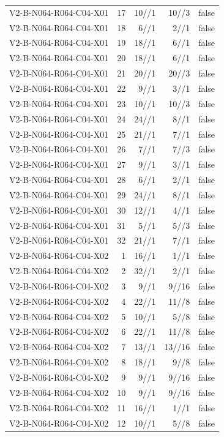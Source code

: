 {\begin{longtable}{lrrrr}
V2-B-N064-R064-C04-X01 & 17 & 10//1 & 10//3 & false \\
V2-B-N064-R064-C04-X01 & 18 & 6//1 & 2//1 & false \\
V2-B-N064-R064-C04-X01 & 19 & 18//1 & 6//1 & false \\
V2-B-N064-R064-C04-X01 & 20 & 18//1 & 6//1 & false \\
V2-B-N064-R064-C04-X01 & 21 & 20//1 & 20//3 & false \\
V2-B-N064-R064-C04-X01 & 22 & 9//1 & 3//1 & false \\
V2-B-N064-R064-C04-X01 & 23 & 10//1 & 10//3 & false \\
V2-B-N064-R064-C04-X01 & 24 & 24//1 & 8//1 & false \\
V2-B-N064-R064-C04-X01 & 25 & 21//1 & 7//1 & false \\
V2-B-N064-R064-C04-X01 & 26 & 7//1 & 7//3 & false \\
V2-B-N064-R064-C04-X01 & 27 & 9//1 & 3//1 & false \\
V2-B-N064-R064-C04-X01 & 28 & 6//1 & 2//1 & false \\
V2-B-N064-R064-C04-X01 & 29 & 24//1 & 8//1 & false \\
V2-B-N064-R064-C04-X01 & 30 & 12//1 & 4//1 & false \\
V2-B-N064-R064-C04-X01 & 31 & 5//1 & 5//3 & false \\
V2-B-N064-R064-C04-X01 & 32 & 21//1 & 7//1 & false \\
V2-B-N064-R064-C04-X02 & 1 & 16//1 & 1//1 & false \\
V2-B-N064-R064-C04-X02 & 2 & 32//1 & 2//1 & false \\
V2-B-N064-R064-C04-X02 & 3 & 9//1 & 9//16 & false \\
V2-B-N064-R064-C04-X02 & 4 & 22//1 & 11//8 & false \\
V2-B-N064-R064-C04-X02 & 5 & 10//1 & 5//8 & false \\
V2-B-N064-R064-C04-X02 & 6 & 22//1 & 11//8 & false \\
V2-B-N064-R064-C04-X02 & 7 & 13//1 & 13//16 & false \\
V2-B-N064-R064-C04-X02 & 8 & 18//1 & 9//8 & false \\
V2-B-N064-R064-C04-X02 & 9 & 9//1 & 9//16 & false \\
V2-B-N064-R064-C04-X02 & 10 & 9//1 & 9//16 & false \\
V2-B-N064-R064-C04-X02 & 11 & 16//1 & 1//1 & false \\
V2-B-N064-R064-C04-X02 & 12 & 10//1 & 5//8 & false \\

\end{longtable}}
